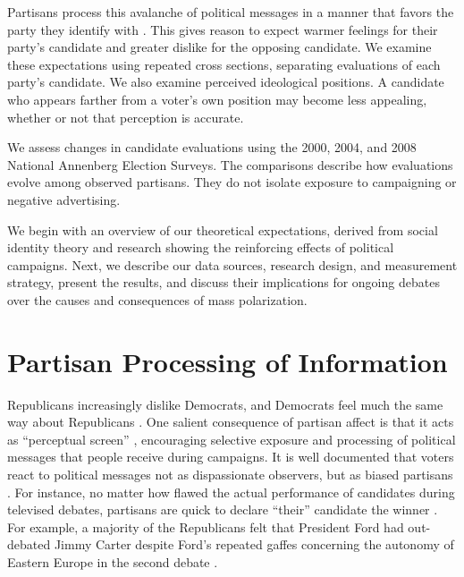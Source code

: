\documentclass[11pt,letterpaper]{article}
\begin{document}
Partisans process this avalanche of political messages in a manner that favors the party they identify with \citep{chang2003, lodge1986, rahn1993}. This gives reason to expect warmer feelings for their party's candidate and greater dislike for the opposing candidate. We examine these expectations using repeated cross sections, separating evaluations of each party's candidate. We also examine perceived ideological positions. A candidate who appears farther from a voter's own position may become less appealing, whether or not that perception is accurate.

We assess changes in candidate evaluations using the 2000, 2004, and 2008 National Annenberg Election Surveys. The comparisons describe how evaluations evolve among observed partisans. They do not isolate exposure to campaigning or negative advertising.

We begin with an overview of our theoretical expectations, derived from social identity theory and research showing the reinforcing effects of political campaigns. Next, we describe our data sources, research design, and measurement strategy, present the results, and discuss their implications for ongoing debates over the causes and consequences of mass polarization.

\section*{Partisan Processing of Information}
Republicans increasingly dislike Democrats, and Democrats feel much the same way about Republicans \citep{iyengar2012}. One salient consequence of partisan affect is that it acts as ``perceptual screen'' \citep{campbell1960}, encouraging selective exposure and processing of political messages that people receive during campaigns. It is well documented that voters react to political messages not as dispassionate observers, but as biased partisans \citep{chang2003, rahn1993, lodge1986, campbell1960, lord1979}.  For instance, no matter how flawed the actual performance of candidates during televised debates, partisans are quick to declare ``their'' candidate the winner \citep{sigelman1984, iyengar2000b}. For example, a majority of the Republicans felt that President Ford had out-debated Jimmy Carter despite Ford's repeated gaffes concerning the autonomy of Eastern Europe in the second debate \citep{sears1979}.
\end{document}
